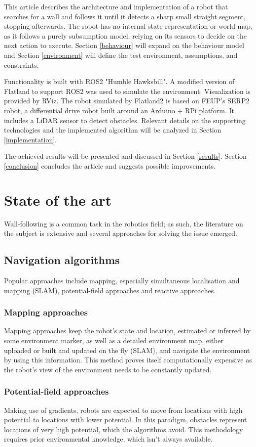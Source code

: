 \documentclass[conference]{IEEEtran}
\begin{document}
This article describes the architecture and implementation of a robot that searches for a wall and follows it until it detects a sharp small straight segment, stopping afterwards. The robot has no internal state representation or world map, as it follows a purely subsumption model, relying on its sensors to decide on the next action to execute. Section \ref{behaviour} will expand on the behaviour model and Section \ref{environment} will define the test environment, assumptions, and constraints.

Functionality is built with ROS2 "Humble Hawksbill". A modified version of Flatland to support ROS2 was used to simulate the environment. Visualization is provided by RViz. The robot simulated by Flatland2 is based on FEUP's SERP2 robot, a differential drive robot built around an Arduino + RPi platform. It includes a LiDAR sensor to detect obstacles. Relevant details on the supporting technologies and the implemented algorithm will be analyzed in Section \ref{implementation}.

The achieved results will be presented and discussed in Section \ref{results}. Section \ref{conclusion} concludes the article and suggests possible improvements.

\section{State of the art} \label{stateOfArt}
Wall-following is a common task in the robotics field; as such, the literature on the subject is extensive and several approaches for solving the issue emerged.
\subsection{Navigation algorithms}
Popular approaches include mapping, especially simultaneous localisation and mapping (SLAM), potential-field approaches and reactive approaches. \cite{6630903}
\subsubsection{Mapping approaches}
Mapping approaches keep the robot's state and location, estimated or inferred by some environment marker, as well as a detailed environment map, either uploaded or built and updated on the fly (SLAM), and navigate the environment by using this information. This method proves itself computationally expensive as the robot's view of the environment needs to be constantly updated.
\subsubsection{Potential-field approaches}
Making use of gradients, robots are expected to move from locations with high potential to locations with lower potential. In this paradigm, obstacles represent locations of very high potential, which the algorithms avoid. This methodology requires prior environmental knowledge, which isn't always available.
\end{document}

